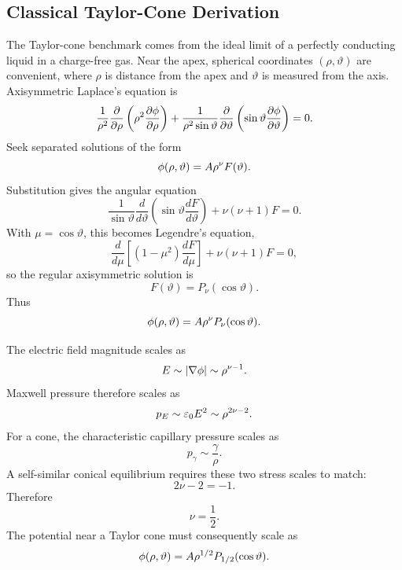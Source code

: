 \subsection{Classical Taylor-Cone Derivation}

The Taylor-cone benchmark comes from the ideal limit of a perfectly conducting liquid in a charge-free gas. Near the apex, spherical coordinates $(\rho,\vartheta)$ are convenient, where $\rho$ is distance from the apex and $\vartheta$ is measured from the axis. Axisymmetric Laplace's equation is
\begin{equation}
\frac{1}{\rho^2}\frac{\partial}{\partial\rho}\left(\rho^2\frac{\partial\phi}{\partial\rho}\right)
+
\frac{1}{\rho^2\sin\vartheta}\frac{\partial}{\partial\vartheta}
\left(\sin\vartheta\frac{\partial\phi}{\partial\vartheta}\right)=0.
\end{equation}
Seek separated solutions of the form
\begin{equation}
    \phi(\rho,\vartheta)=A\rho^\nu F(\vartheta).
\end{equation}
Substitution gives the angular equation
\begin{equation}
\frac{1}{\sin\vartheta}\frac{d}{d\vartheta}
\left(\sin\vartheta\frac{dF}{d\vartheta}\right)
+\nu(\nu+1)F=0.
\end{equation}
With $\mu=\cos\vartheta$, this becomes Legendre's equation,
\begin{equation}
\frac{d}{d\mu}\left[(1-\mu^2)\frac{dF}{d\mu}\right]+\nu(\nu+1)F=0,
\end{equation}
so the regular axisymmetric solution is
\begin{equation}
    F(\vartheta)=P_\nu(\cos\vartheta).
\end{equation}
Thus
\begin{equation}
    \phi(\rho,\vartheta)=A\rho^\nu P_\nu(\cos\vartheta).
\label{eq:taylor_separated_full}
\end{equation}

The electric field magnitude scales as
\begin{equation}
    E\sim |\nabla\phi|\sim \rho^{\nu-1}.
\end{equation}
Maxwell pressure therefore scales as
\begin{equation}
    p_E\sim \varepsilon_0 E^2\sim \rho^{2\nu-2}.
\end{equation}
For a cone, the characteristic capillary pressure scales as
\begin{equation}
    p_\gamma\sim \frac{\gamma}{\rho}.
\end{equation}
A self-similar conical equilibrium requires these two stress scales to match:
\begin{equation}
    2\nu-2=-1.
\end{equation}
Therefore
\begin{equation}
    \nu=\frac{1}{2}.
\end{equation}
The potential near a Taylor cone must consequently scale as
\begin{equation}
    \phi(\rho,\vartheta)=A\rho^{1/2}P_{1/2}(\cos\vartheta).
\end{equation}

